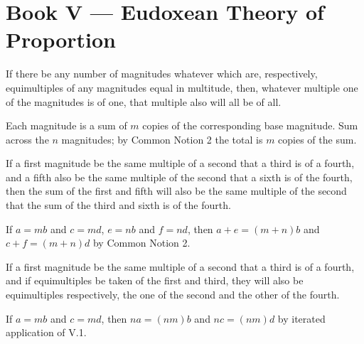%
%

\section{Book V --- Eudoxean Theory of Proportion}
\label{sec:book-V}

\begin{claim}
\label{prop:V.1}
If there be any number of magnitudes whatever which are, respectively,
equimultiples of any magnitudes equal in multitude, then, whatever
multiple one of the magnitudes is of one, that multiple also will all
be of all.
\end{claim}
\begin{evidence}[Proof of V.1]
\label{ev:V.1}
Each magnitude is a sum of $m$ copies of the corresponding base
magnitude.  Sum across the $n$ magnitudes; by Common Notion 2 the
total is $m$ copies of the sum.
\end{evidence}

\begin{claim}
\label{prop:V.2}
If a first magnitude be the same multiple of a second that a third is
of a fourth, and a fifth also be the same multiple of the second that
a sixth is of the fourth, then the sum of the first and fifth will
also be the same multiple of the second that the sum of the third and
sixth is of the fourth.
\end{claim}
\begin{evidence}[Proof of V.2]
\label{ev:V.2}
If $a = mb$ and $c = md$, $e = nb$ and $f = nd$, then $a + e = (m+n)b$
and $c + f = (m+n)d$ by Common Notion 2.
\end{evidence}

\begin{claim}
\label{prop:V.3}
If a first magnitude be the same multiple of a second that a third is
of a fourth, and if equimultiples be taken of the first and third,
they will also be equimultiples respectively, the one of the second
and the other of the fourth.
\end{claim}
\begin{evidence}[Proof of V.3]
\label{ev:V.3}
If $a = mb$ and $c = md$, then $na = (nm)b$ and $nc = (nm)d$ by
iterated application of V.1.
\end{evidence}

